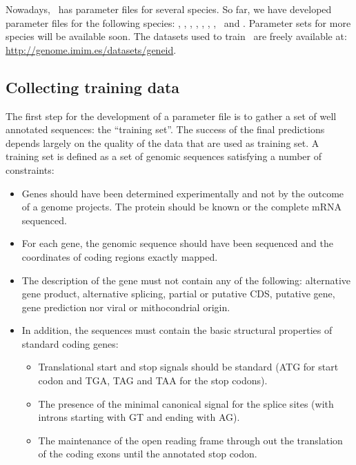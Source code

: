 Nowadays, \geneid\ has parameter files for several species. So far, we
have developed parameter files for the following species:
\AtL, \CeL, \DdL, \DmL, \HsL, \OsL, \PfL, \TnL\ and \TaL. Parameter 
sets for more species will be available soon. The datasets used to
train \geneid\ are freely available at:
\url{http://genome.imim.es/datasets/geneid}.

\subsection{Collecting training data}

The first step for the development of a parameter file is to gather a
set of well annotated sequences: the ``training set''. The success of
the final predictions depends largely on the quality of the data that
are used as training set. A training set is defined as a set of
genomic sequences satisfying a number of constraints:
\begin{itemize}
\item Genes should have been determined experimentally and not 
by the outcome of a genome projects. The protein should be known or the
complete mRNA sequenced. 

\item For each gene, the genomic sequence should have been sequenced 
and the coordinates of coding regions exactly mapped.

\item The description of the gene must not contain any of the following:
alternative gene product, alternative splicing, partial or putative
CDS, putative gene, gene prediction nor viral or mithocondrial origin.

\item In addition, the sequences must contain the basic 
structural properties of standard coding genes:
  \begin{itemize}
    \item Translational start and stop signals should be standard (ATG
    for start codon and TGA, TAG and TAA for the stop codons).

    \item The presence of the minimal canonical signal for the splice
    sites (with introns starting with GT and ending with AG).

    \item The maintenance of the open reading frame through out the
    translation of the coding exons until the annotated stop codon.
  \end{itemize}
\end{itemize}



